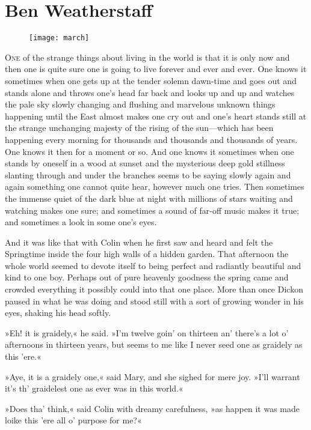 \chapter{Ben Weatherstaff} 
	
\begin{figure}[t!]
\centering
\texttt{[image: march]}
\end{figure}

	\lettrine[lines=6]{O}{ne} of the strange things about living in the world is that it is only now and then one is quite sure one is going to live forever and ever and ever. One knows it sometimes when one gets up at the tender solemn dawn-time and goes out and stands alone and throws one's head far back and looks up and up and watches the pale sky slowly changing and flushing and marvelous unknown things happening until the East almost makes one cry out and one's heart stands still at the strange unchanging majesty of the rising of the sun—which has been happening every morning for thousands and thousands and thousands of years. One knows it then for a moment or so. And one knows it sometimes when one stands by oneself in a wood at sunset and the mysterious deep gold stillness slanting through and under the branches seems to be saying slowly again and again something one cannot quite hear, however much one tries. Then sometimes the immense quiet of the dark blue at night with millions of stars waiting and watching makes one sure; and sometimes a sound of far-off music makes it true; and sometimes a look in some one's eyes.

And it was like that with Colin when he first saw and heard and felt the Springtime inside the four high walls of a hidden garden. That afternoon the whole world seemed to devote itself to being perfect and radiantly beautiful and kind to one boy. Perhaps out of pure heavenly goodness the spring came and crowded everything it possibly could into that one place. More than once Dickon paused in what he was doing and stood still with a sort of growing wonder in his eyes, shaking his head softly.

»Eh! it is graidely,« he said. »I'm twelve goin' on thirteen an' there's a lot o' afternoons in thirteen years, but seems to me like I never seed one as graidely as this 'ere.«

»Aye, it is a graidely one,« said Mary, and she sighed for mere joy. »I'll warrant it's th' graidelest one as ever was in this world.«

»Does tha' think,« said Colin with dreamy carefulness, »as happen it was made loike this 'ere all o' purpose for me?«


